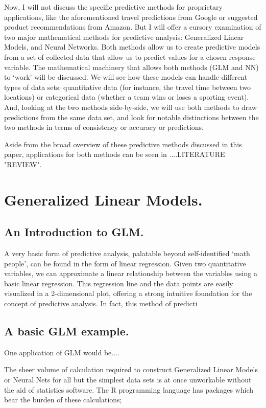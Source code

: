 \documentclass[12pt]{article}
\begin{document}
Now, I will not discuss the specific predictive methods for proprietary applications, like the aforementioned travel predictions from Google or 
suggested product recommendations from Amazon.  But I will offer a cursory examination of two major mathematical methods for predictive analysis:
Generalized Linear Models, and Neural Networks.  Both methods allow us to create predictive models from a set of collected data that allow us to
predict values for a chosen response variable.  The mathematical machinery that allows both methods (GLM and NN) to `work'  will be discussed. 
We will see how these models can handle different types of data sets: quantitative data (for instance, the travel time between two locations) or 
categorical data (whether a team wins or loses a sporting event).  And, looking at the two methods side-by-side, we will use both methods to draw
predictions from the same data set, and look for notable distinctions between the two methods in terms of consistency or accuracy or predictions.

Aside from the broad overview of these predictive methods discussed in this paper, applications for both methods can be seen in ....LITERATURE 
"REVIEW".

\section{Generalized Linear Models.}

\subsection{An Introduction to GLM.}
A very basic form of predictive analysis, palatable beyond self-identified `math people', can be found in the form
of linear regression.  Given two quantitative variables, we can approximate a linear relationship between the variables using a basic linear
regression.  This regression line and the data points are easily visualized in a 2-dimensional plot, offering a strong intuitive foundation for the
concept of predictive analysis.  In fact, this method of predicti

\subsection{A basic GLM example.}
One application of GLM would be....

The sheer volume of calculation required to construct Generalized Linear Models or Neural Nets for all but the simplest data sets is at once 
unworkable without the aid of statistics software.  The R programming language has packages which bear the burden of these calculations; 
\end{document}
